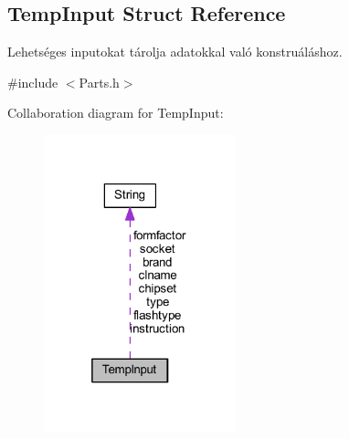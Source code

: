 \hypertarget{struct_temp_input}{}\subsection{Temp\+Input Struct Reference}
\label{struct_temp_input}


Lehetséges inputokat tárolja adatokkal való konstruáláshoz.  




{\ttfamily \#include $<$Parts.\+h$>$}



Collaboration diagram for Temp\+Input\+:
\nopagebreak
\begin{figure}[H]
\begin{center}
\leavevmode
\includegraphics[width=157pt]{struct_temp_input__coll__graph}
\end{center}
\end{figure}
